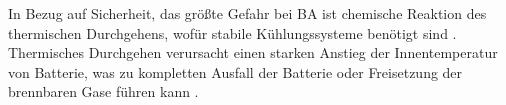 In Bezug auf Sicherheit, das größte Gefahr bei BA ist chemische Reaktion des thermischen Durchgehens, wofür stabile
Kühlungssysteme benötigt sind \cite{donckers2024electric}. Thermisches Durchgehen verursacht einen starken Anstieg der 
Innentemperatur von Batterie, was zu kompletten Ausfall der Batterie oder Freisetzung der brennbaren Gase führen kann \cite{shahid2022review}.
